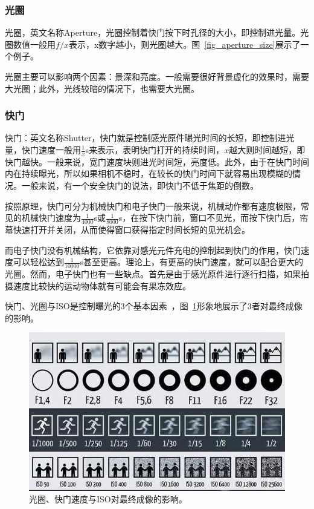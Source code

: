 \documentclass{ctexart}
\begin{document}
\subsubsection{光圈}
光圈，英文名称Aperture，光圈控制着快门按下时孔径的大小，即控制进光量。光圈数值一般用${f/x}$表示，x数字越小，则光圈越大。图~\ref{fig_aperture_size}展示了一个例子。

光圈主要可以影响两个因素：景深和亮度。一般需要很好背景虚化的效果时，需要大光圈；此外，光线较暗的情况下，也需要大光圈。

\subsubsection{快门}
快门：英文名称Shutter，快门就是控制感光原件曝光时间的长短，即控制进光量，快门速度一般用$\frac{1}{x}$s来表示，表明快门打开的持续时间，$x$越大则时间越短，即快门越快。一般来说，宽门速度块则进光时间短，亮度低。此外，由于在快门时间内在持续曝光，所以如果相机不稳时，在较长的快门时间下就容易出现模糊的情况。一般来说，有一个安全快门的说法，即快门不低于焦距的倒数。

按照原理，快门可分为机械快门和电子快门一般来说，机械动作都有速度极限，常见的机械快门速度为$\frac{1}{4000}$s或$\frac{1}{8000}$s，在按下快门前，窗口不见光，而按下快门后，帘幕快速打开并关闭，从而使得窗口获得指定时间长短的见光机会。

而电子快门没有机械结构，它依靠对感光元件充电的控制起到快门的作用，快门速度可以轻松达到$\frac{1}{10000}$s甚至更高。理论上，有更高的快门速度，就可以配合更大的光圈。然而，电子快门也有一些缺点。首先是由于感光原件进行逐行扫描，如果拍摄速度比较快的运动物体就有可能会有果冻效应。

快门、光圈与ISO是控制曝光的3个基本因素~\cite{iso_aperture_shutter}，图~\ref{fig_iso_aperture_shutter}形象地展示了3者对最终成像的影响。

\begin{figure}[h!]
    \centering
    \label{fig_iso_aperture_shutter}
    \includegraphics[width=.7\linewidth]{imgs/iso_aperture_shutter.jpg}
    \caption{光圈、快门速度与ISO对最终成像的影响。}
\end{figure}
\end{document}
